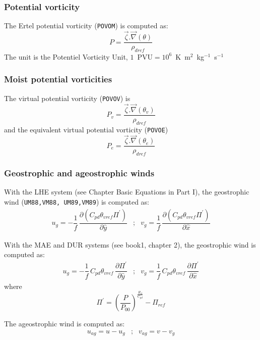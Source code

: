 \subsubsection{Potential vorticity}
The Ertel potential vorticity  ({\tt POVOM}) is computed as:
\begin{equation}
P = \dfrac{\vec\zeta .\vec\nabla(\theta)}{\rho_{dref}} 
\end{equation}
The unit is the Potentiel Vorticity Unit, 
$1$~PVU$=10^6$~K~m$^2$~kg$^{-1}$~s$^{-1}$


\subsubsection{Moist potential vorticities}
The virtual potential vorticity ({\tt POVOV}) is
\begin{equation}
P_v = \dfrac{\vec\zeta .\vec\nabla(\theta_v)}{\rho_{dref}} 
\end{equation}
and the equivalent virtual potential vorticity ({\tt POVOE}) 
\begin{equation}
P_e = \dfrac{\vec\zeta .\vec\nabla(\theta_e)}{\rho_{dref}} 
\end{equation}


\subsubsection{Geostrophic and ageostrophic winds}
With the LHE system (see Chapter Basic Equations in Part I), the geostrophic wind 
({\tt UM88,VM88, UM89,VM89}) is computed as:
\begin{eqnarray}
u_g= - \dfrac{1}{f}\,\dfrac{\partial{(C_{pd}\theta_{vref}\Pi^{'})}}{\partial\hat{y}} &;&
v_g=   \dfrac{1}{f}\, \dfrac{\partial{(C_{pd}\theta_{vref}\Pi^{'})}}{\partial\hat{x}} 
\end{eqnarray}

\noindent With the MAE and DUR systems (see book1, chapter 2), 
the geostrophic wind is computed as:
\begin{eqnarray}
u_g= - \dfrac{1}{f} \, C_{pd}\theta_{vref} \,
       \dfrac{\partial\Pi^{'}}{\partial\hat{y}} &;&
v_g=   \dfrac{1}{f} \, C_{pd}\theta_{vref} \,
       \dfrac{\partial\Pi^{'}}{\partial\hat{x}}
\end{eqnarray}
where $$
\Pi^{'} = \left(\dfrac{P}{P_{00}}\right)^{\frac{R_d}{C_{pd} }} - \Pi_{ref} $$

\noindent The ageostrophic wind is computed as: 
\begin{eqnarray}
u_{ag} = u - u_g &;& v_{ag} = v - v_g \nonumber
\end{eqnarray}


